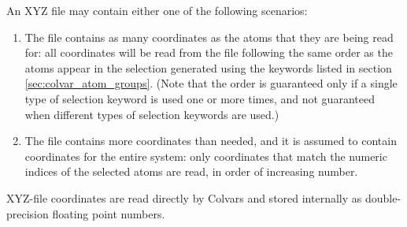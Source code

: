 An XYZ file may contain either one of the following scenarios:
\begin{enumerate}
\item[\emph{(i)}] The file contains as many coordinates as the atoms that they are being read for: all coordinates will be read from the file following the same order as the atoms appear in the selection generated using the keywords listed in section \ref{sec:colvar_atom_groups}.
  (Note that the order is guaranteed only if a single type of selection keyword is used one or more times, and not guaranteed when different types of selection keywords are used.)
\item[\emph{(ii)}] The file contains more coordinates than needed, and it is assumed to contain coordinates for the entire system: only coordinates that match the numeric indices of the selected atoms are read, in order of increasing number.
\end{enumerate}

XYZ-file coordinates are read directly by Colvars and stored internally as double-precision floating point numbers.


